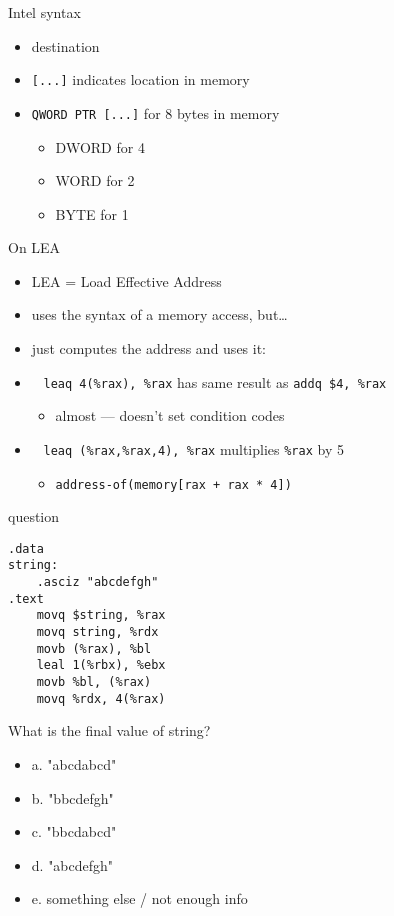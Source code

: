 \begin{frame}{Intel syntax}
    \begin{itemize}
    \item destination 
    \item {\tt [...]} indicates location in memory
    \item {\tt QWORD PTR [...]} for 8 bytes in memory
        \begin{itemize}
        \item DWORD for 4
        \item WORD for 2
        \item BYTE for 1
        \end{itemize}
    \end{itemize}
\end{frame}

\begin{frame}[fragile,label=LEA]{On LEA}
    \begin{itemize}
    \item LEA = Load Effective Address
    \item uses the syntax of a memory access, but\ldots{}
    \item just computes the address and uses it:
    \item ~ \lstinline|leaq 4(%rax), %rax| has same result as \lstinline|addq $4, %rax|
        \begin{itemize}
        \item almost --- doesn't set condition codes
        \end{itemize}
    \item ~ \lstinline|leaq (%rax,%rax,4), %rax| multiplies {\tt \%rax} by 5
        \begin{itemize}
        \item {\tt address-of(memory[rax + rax * 4])}
        \end{itemize}
    \end{itemize}
\end{frame}

\begin{frame}[fragile,label=question]{question}
\lstset{style=small}
\begin{lstlisting}
.data
string:
    .asciz "abcdefgh"
.text
    movq $string, %rax
    movq string, %rdx
    movb (%rax), %bl
    leal 1(%rbx), %ebx
    movb %bl, (%rax)
    movq %rdx, 4(%rax)
\end{lstlisting}
{\small What is the final value of string?}
\begin{itemize}
\item a. "abcdabcd"
\item b. "bbcdefgh"
\item c. "bbcdabcd"
\item d. "abcdefgh"
\item e. something else / not enough info
\end{itemize}
\end{frame}

